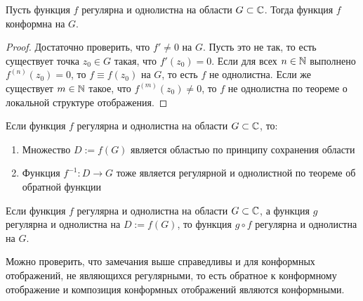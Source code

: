 \begin{proposition}
	Пусть функция $f$ регулярна и однолистна на области $G \subset \mathbb{C}$. Тогда функция $f$ конформна на $G$.
\end{proposition}

\begin{proof}
	Достаточно проверить, что $f' \ne 0$ на $G$. Пусть это не так, то есть существует точка $z_0 \in G$ такая, что $f'(z_0) = 0$. Если для всех $n \in \mathbb{N}$ выполнено $f^{(n)}(z_0) = 0$, то $f \equiv f(z_0)$ на $G$, то есть $f$ не однолистна. Если же существует $m \in \mathbb{N}$ такое, что $f^{(m)}(z_0) \ne 0$, то $f$ не однолистна по теореме о локальной структуре отображения.
\end{proof}

\begin{note}
	Если функция $f$ регулярна и однолистна на области $G \subset \mathbb{C}$, то:
	\begin{enumerate}
		\item Множество $D := f(G)$ является областью по принципу сохранения области
		\item Функция $f^{-1} : D \to G$ тоже является регулярной и однолистной по теореме об обратной функции
	\end{enumerate}
\end{note}

\pagebreak
\begin{note}
	Если функция $f$ регулярна и однолистна на области $G \subset \mathbb{C}$, а функция $g$ регулярна и однолистна на $D := f(G)$, то функция $g \circ f$ регулярна и однолистна на $G$.
\end{note}

\begin{note}
	Можно проверить, что замечания выше справедливы и для конформных отображений, не являющихся регулярными, то есть обратное к конформному отображение и композиция конформных отображений являются конформными.
\end{note}

